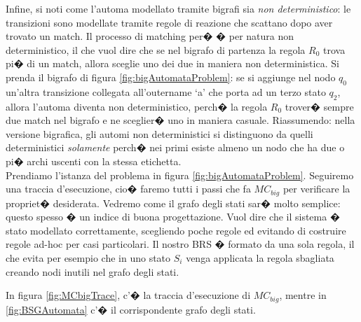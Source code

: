 Infine, si noti come l'automa modellato tramite bigrafi sia \emph{non deterministico}: le transizioni sono modellate tramite regole di reazione che scattano dopo aver trovato un match. Il processo di matching per� � per natura non deterministico, il che vuol dire che se nel bigrafo di partenza la regola $R_0$ trova pi� di un match, allora sceglie uno dei due in maniera non deterministica. Si prenda il bigrafo di figura \ref{fig:bigAutomataProblem}: se si aggiunge nel nodo $q_0$ un'altra transizione collegata all'outername `a' che porta ad un terzo stato $q_2$, allora l'automa diventa non deterministico, perch� la regola $R_0$ trover� sempre due match nel bigrafo e ne sceglier� uno in maniera casuale.
Riassumendo: nella versione bigrafica, gli automi non deterministici si distinguono da quelli deterministici \emph{solamente} perch� nei primi esiste almeno un nodo che ha due o pi� archi uscenti con la stessa etichetta.\\


Prendiamo l'istanza del problema in figura \ref{fig:bigAutomataProblem}. Seguiremo una traccia d'esecuzione, cio� faremo tutti i passi che fa $MC_{big}$ per verificare la propriet� desiderata. Vedremo come il grafo degli stati sar� molto semplice: questo spesso � un indice di buona progettazione. Vuol dire che il sistema � stato modellato correttamente, scegliendo poche regole ed evitando di costruire regole ad-hoc per casi particolari. Il nostro BRS � formato da una sola regola, il che evita per esempio che in uno stato $S_i$ venga applicata la regola sbagliata creando nodi inutili nel grafo degli stati.

In figura \ref{fig:MCbigTrace}, c'� la traccia d'esecuzione di $MC_{big}$, mentre in \ref{fig:BSGAutomata} c'� il corrispondente grafo degli stati. \\


